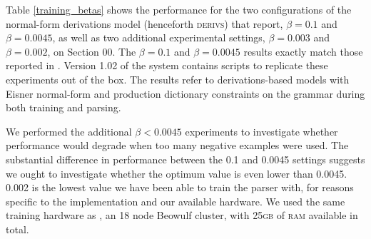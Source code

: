 Table \ref{training_betas} shows the performance for the two configurations of
the normal-form derivations model (henceforth \textsc{derivs}) that
\citet{clark:cl07} report, $\beta=0.1$ and $\beta=0.0045$, as well as two
additional experimental settings, $\beta=0.003$ and $\beta=0.002$, on Section
00. The $\beta=0.1$ and $\beta=0.0045$ results exactly match those reported in
\citet{clark:cl07}. Version 1.02 of the \candc system contains scripts to
replicate these experiments out of the box. The results refer to
derivations-based models with Eisner normal-form and production dictionary
constraints on the grammar during both training and parsing.

We performed the additional $\beta<0.0045$ experiments to investigate whether
performance would degrade when too many negative examples were used. The
substantial difference in performance between the 0.1 and 0.0045 settings
suggests we ought to investigate whether the optimum value is even lower than
0.0045. 0.002 is the lowest value we have been able to train the parser with,
for reasons specific to the implementation and our available hardware.
We used the same training hardware as \citet{clark:cl07}, an 18 node Beowulf
cluster, with 25\textsc{gb} of \textsc{ram} available in total.

